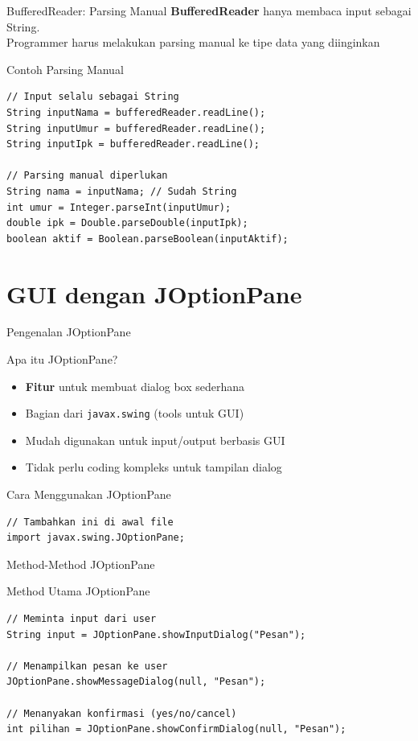 \documentclass{beamer}
\begin{document}
\begin{frame}[fragile]{BufferedReader: Parsing Manual}
  \textbf{BufferedReader} hanya membaca input sebagai String.\\Programmer harus melakukan parsing manual ke tipe data yang diinginkan
  
  \begin{exampleblock}{Contoh Parsing Manual}
    \begin{lstlisting}
// Input selalu sebagai String
String inputNama = bufferedReader.readLine();
String inputUmur = bufferedReader.readLine();
String inputIpk = bufferedReader.readLine();

// Parsing manual diperlukan
String nama = inputNama; // Sudah String
int umur = Integer.parseInt(inputUmur);
double ipk = Double.parseDouble(inputIpk);
boolean aktif = Boolean.parseBoolean(inputAktif);
    \end{lstlisting}
  \end{exampleblock}
\end{frame}

\section{GUI dengan JOptionPane}
\begin{frame}[fragile]{Pengenalan JOptionPane}
  \begin{block}{Apa itu JOptionPane?}
    \begin{itemize}
      \item \textbf{Fitur} untuk membuat dialog box sederhana
      \item Bagian dari \texttt{javax.swing} (tools untuk GUI)
      \item Mudah digunakan untuk input/output berbasis GUI
      \item Tidak perlu coding kompleks untuk tampilan dialog
    \end{itemize}
  \end{block}
  
  \begin{block}{Cara Menggunakan JOptionPane}
    \begin{lstlisting}
// Tambahkan ini di awal file
import javax.swing.JOptionPane;
    \end{lstlisting}
  \end{block}
\end{frame}

\begin{frame}[fragile]{Method-Method JOptionPane}
  \begin{block}{Method Utama JOptionPane}
    \begin{lstlisting}
// Meminta input dari user
String input = JOptionPane.showInputDialog("Pesan");

// Menampilkan pesan ke user
JOptionPane.showMessageDialog(null, "Pesan");

// Menanyakan konfirmasi (yes/no/cancel)
int pilihan = JOptionPane.showConfirmDialog(null, "Pesan");
    \end{lstlisting}
  \end{block}
\end{frame}
\end{document}
